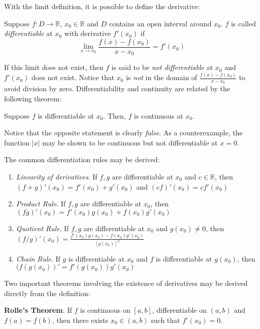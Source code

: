 With the limit definition, it is possible to define the derivative:

\begin{defn}
    Suppose $f:D\to\mathbb{R}$, $x_0\in \mathbb{R}$ and $D$ contains an open interval around $x_0$. $f$ is called \textit{differentiable} at $x_0$ with derivative $f'(x_0)$ if \[\lim_{x\to x_0} \frac{f(x) - f(x_0)}{x - x_0} = f'(x_0)\]
\end{defn}

If this limit does not exist, then $f$ is said to be \textit{not differentiable} at $x_0$ and $f'(x_0)$ does not exist. Notice that $x_0$ is \textit{not} in the domain of $\frac{f(x)-f(x_0)}{x-x_0}$ to avoid division by zero. Differentiability and continuity are related by the following theorem:

\begin{theorem*}
    Suppose $f$ is differentiable at $x_0$. Then, $f$ is continuous at $x_0$.
\end{theorem*}
Notice that the opposite statement is clearly \textit{false}. As a counterexample, the function $|x|$ may be shown to be continuous but not differentiable at $x=0$.

\newpage

The common differentiation rules may be derived:

\begin{enumerate}
    \item[] \textit{Linearity of derivatives}. If $f,g$ are differentiable at $x_0$ and $c\in\mathbb{R}$, then $(f+g)'(x_0) = f'(x_0)+g'(x_0)$ and $(cf)'(x_0)= cf'(x_0)$
    \item[] \textit{Product Rule}. If $f,g$ are differentiable at $x_0$, then $(fg)'(x_0) = f'(x_0)g(x_0) + f(x_0)g'(x_0)$
    \item[] \textit{Quotient Rule}. If $f,g$ are differentiable at $x_0$ and $g(x_0)\neq 0$, then $(f/g)'(x_0) = \frac{f'(x_0)g(x_0)-f(x_0)g'(x_0)}{[g(x_0)]^2}$
    \item[] \textit{Chain Rule}. If $g$ is differentiable at $x_0$ and $f$ is differentiable at $g(x_0)$, then $(f(g(x_0))' = f'(g(x_0)) g'(x_0)$
\end{enumerate}

Two important theorems involving the existence of derivatives may be derived directly from the definition:

\textbf{Rolle's Theorem}. If $f$ is continuous on $[a,b]$, differentiable on $(a,b)$ and $f(a)=f(b)$, then there exists $x_0\in (a,b)$ such that $f'(x_0) = 0$.

